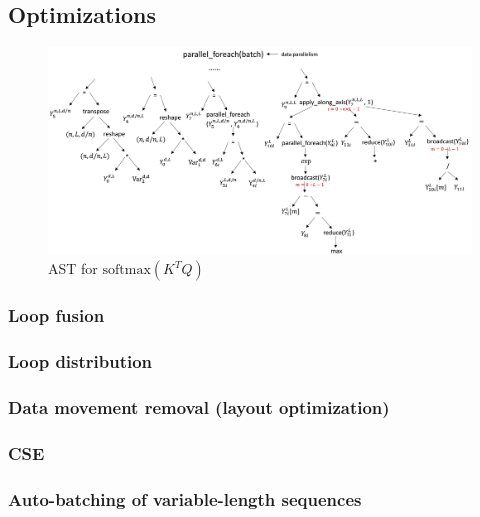 \subsection{Optimizations}

\begin{figure}[htbp]
\centering
\includegraphics[width=1.\textwidth]{images/transformer.png}
\caption{AST for $\text{softmax}(K^TQ)$}
\label{Fig.}
\end{figure}

\subsubsection {Loop fusion}

\subsubsection {Loop distribution}

\subsubsection {Data movement removal (layout optimization)}

\subsubsection {CSE}

\subsubsection {Auto-batching of variable-length sequences}
